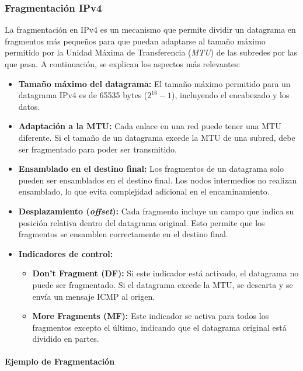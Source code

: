 \documentclass[a4paper,12pt]{article}
\begin{document}
\subsubsection{Fragmentación IPv4}

La fragmentación en IPv4 es un mecanismo que permite dividir un datagrama en fragmentos más pequeños para que puedan adaptarse al tamaño máximo permitido por la Unidad Máxima de Transferencia (\textit{MTU}) de las subredes por las que pasa. A continuación, se explican los aspectos más relevantes:

\begin{itemize}
    \item \textbf{Tamaño máximo del datagrama:} El tamaño máximo permitido para un datagrama IPv4 es de 65535 bytes (\(2^{16} - 1\)), incluyendo el encabezado y los datos.
    \item \textbf{Adaptación a la MTU:} Cada enlace en una red puede tener una MTU diferente. Si el tamaño de un datagrama excede la MTU de una subred, debe ser fragmentado para poder ser transmitido.
    \item \textbf{Ensamblado en el destino final:} Los fragmentos de un datagrama solo pueden ser ensamblados en el destino final. Los nodos intermedios no realizan ensamblado, lo que evita complejidad adicional en el encaminamiento.
    \item \textbf{Desplazamiento (\textit{offset}):} Cada fragmento incluye un campo que indica su posición relativa dentro del datagrama original. Esto permite que los fragmentos se ensamblen correctamente en el destino final.
    \item \textbf{Indicadores de control:}
    \begin{itemize}
        \item \textbf{Don't Fragment (DF):} Si este indicador está activado, el datagrama no puede ser fragmentado. Si el datagrama excede la MTU, se descarta y se envía un mensaje ICMP al origen.
        \item \textbf{More Fragments (MF):} Este indicador se activa para todos los fragmentos excepto el último, indicando que el datagrama original está dividido en partes.
    \end{itemize}
\end{itemize}

\paragraph{Ejemplo de Fragmentación}
\end{document}

